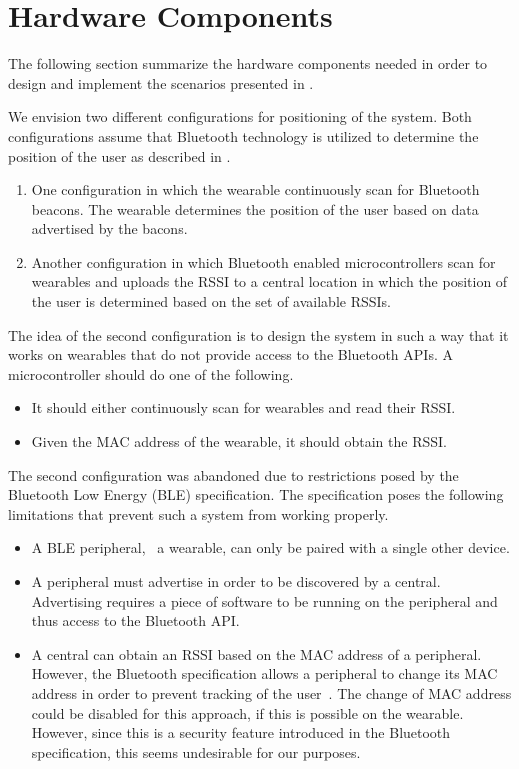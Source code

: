 \section{Hardware Components}
\label{sec:analysis:system-components}

The following section summarize the hardware components needed in order to design and implement the scenarios presented in .

We envision two different configurations for positioning of the system. Both configurations assume that Bluetooth technology is utilized to determine the position of the user as described in .

\begin{enumerate}
\item One configuration in which the wearable continuously scan for Bluetooth beacons. The wearable determines the position of the user based on data advertised by the bacons.
\item Another configuration in which Bluetooth enabled microcontrollers scan for wearables and uploads the RSSI to a central location in which the position of the user is determined based on the set of available RSSIs.
\end{enumerate}

The idea of the second configuration is to design the system in such a way that it works on wearables that do not provide access to the Bluetooth APIs. A microcontroller should do one of the following.

\begin{itemize}
\item It should either continuously scan for wearables and read their RSSI.
\item Given the MAC address of the wearable, it should obtain the RSSI.
\end{itemize}

The second configuration was abandoned due to restrictions posed by the Bluetooth Low Energy (BLE) specification. The specification poses the following limitations that prevent such a system from working properly.

\begin{itemize}
\item A BLE peripheral, \eg~a wearable, can only be paired with a single other device.
\item A peripheral must advertise in order to be discovered by a central. Advertising requires a piece of software to be running on the peripheral and thus access to the Bluetooth API.
\item A central can obtain an RSSI based on the MAC address of a peripheral. However, the Bluetooth specification allows a peripheral to change its MAC address in order to prevent tracking of the user~\cite[p.~91]{Bluetooth2010Bluetooth_vol_1}. The change of MAC address could be disabled for this approach, if this is possible on the wearable. However, since this is a security feature introduced in the Bluetooth specification, this seems undesirable for our purposes.
\end{itemize}

